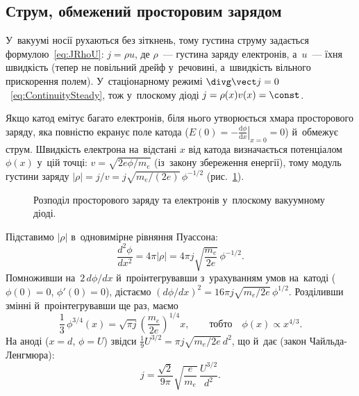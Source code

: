 \subsection*{Струм, обмежений просторовим зарядом}


У~вакуумі носії рухаються без зіткнень, тому густина струму задається
формулою~\eqref{eq:JRhoU}: $j=\rho u$, де $\rho$~--- густина заряду електронів, а~$u$~---
їхня швидкість (тепер не повільний дрейф у~речовині, а~швидкість вільного прискорення
полем). У~стаціонарному режимі $\divg\vect j=0$~\eqref{eq:ContinuitySteady}, тож
у~плоскому діоді $j=\rho(x)v(x)=\const$.

Якщо катод емітує багато електронів, біля нього утворюється хмара просторового заряду, яка
повністю екранує поле катода ($E(0) =
-\left.\frac{\mathrm{d}\phi}{\mathrm{d}x}\right|_{x=0} = 0$) й~обмежує струм. Швидкість
електрона на~відстані $x$ від катода визначається потенціалом $\phi(x)$ у~цій точці:
$v=\sqrt{2e\phi/m_e}$ (із~закону збереження енергії), тому модуль густини заряду $|\rho| =
j/v = j\sqrt{m_e/(2e)}\,\phi^{-1/2}$ (рис.~\ref{tikz:DiodeProblem}).

\begin{figure}[h!]\centering
	\caption{Розподіл просторового заряду та електронів у~плоскому вакуумному
	діоді.}\label{tikz:DiodeProblem}
\end{figure}

Підставимо $|\rho|$ в~одновимірне рівняння Пуассона:
\begin{equation*}
	\frac{d^2\phi}{dx^2} = 4\pi |\rho| = 4\pi j \sqrt{\frac{m_e}{2e}} \, \phi^{-1/2}.
\end{equation*}
Помноживши на~$2\,d\phi/dx$ й~проінтегрувавши з~урахуванням умов на~катоді ($\phi(0)=0$,
$\phi'(0)=0$), дістаємо $(d\phi/dx)^2 = 16\pi j \sqrt{m_e/2e}\,\phi^{1/2}$. Розділивши
змінні й~проінтегрувавши ще раз, маємо
\begin{equation*}
	\frac{1}{3}\,\phi^{3/4}(x) = \sqrt{\pi j} \left(\frac{m_e}{2e}\right)^{1/4} x, \qquad\text{тобто}\quad \phi(x)\propto x^{4/3}.
\end{equation*}
На аноді ($x=d$, $\phi=U$) звідси $\tfrac19 U^{3/2} = \pi j \sqrt{m_e/2e}\, d^2$, що й~дає
 (закон Чайльда-Ленгмюра):
\begin{equation}\label{eq:ChildLangmuir}
	j = \frac{\sqrt2}{9\pi}\sqrt{\frac{e}{m_e}}\,\frac{U^{3/2}}{d^2}.
\end{equation}

